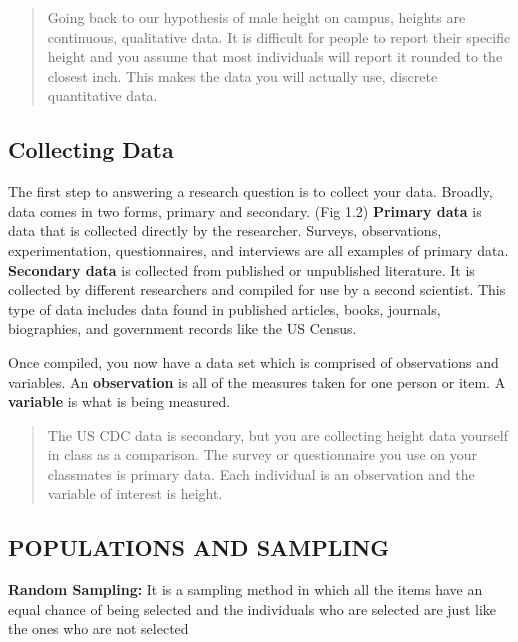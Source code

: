 \documentclass[
]{book}
\begin{document}
\begin{quote}
Going back to our hypothesis of male height on campus, heights
are continuous, qualitative data. It is difficult for people to
report their specific height and you assume that most
individuals will report it rounded to the closest inch. This
makes the data you will actually use, discrete quantitative
data.
\end{quote}

\hypertarget{collecting-data-1}{%
\subsection{Collecting Data}\label{collecting-data-1}}

The first step to answering a research question is to collect
your data. Broadly, data comes in two forms, primary and
secondary. (Fig 1.2) \textbf{Primary data} is data that is collected
directly by the researcher. Surveys, observations,
experimentation, questionnaires, and interviews are all examples
of primary data. \textbf{Secondary data} is collected from published
or unpublished literature. It is collected by different
researchers and compiled for use by a second scientist. This type
of data includes data found in published articles, books,
journals, biographies, and government records like the US Census.

Once compiled, you now have a data set which is comprised of
observations and variables. An \textbf{observation} is all of the
measures taken for one person or item. A \textbf{variable} is what is
being measured.

\begin{quote}
The US CDC data is secondary, but you are collecting height
data yourself in class as a comparison. The survey or
questionnaire you use on your classmates is primary data. Each
individual is an observation and the variable of interest is
height.
\end{quote}

\hypertarget{populations-and-sampling-1}{%
\subsection{POPULATIONS AND SAMPLING}\label{populations-and-sampling-1}}

\textbf{Random Sampling:} It is a sampling method in which all the
items have an equal chance of being selected and the individuals
who are selected are just like the ones who are not selected
\end{document}
